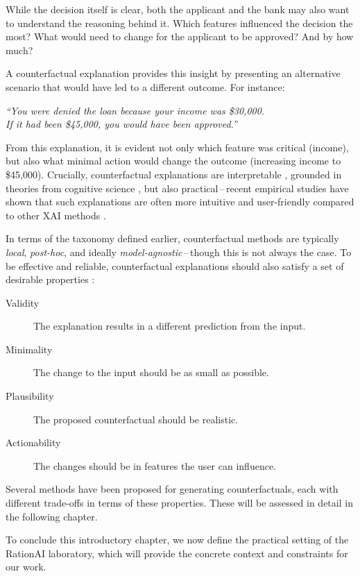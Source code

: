 While the decision itself is clear, both the applicant and the bank may also want to understand the reasoning behind it. Which features influenced the decision the most? What would need to change for the applicant to be approved? And by how much?

A counterfactual explanation provides this insight by presenting an alternative scenario that would have led to a different outcome. For instance:

\begin{center}
    \textit{\enquote{You were denied the loan because your income was \$30,000.\\
        If it had been \$45,000, you would have been approved.}}
\end{center}

From this explanation, it is evident not only which feature was critical (income), but also what minimal action would change the outcome (increasing income to \$45,000).
Crucially, counterfactual explanations are interpretable \cite{pearl2009causal},
grounded in theories from cognitive science \cite{byrne2019counterfactuals},
but also practical\,--\,recent empirical studies have shown that such explanations are often
more intuitive and user-friendly compared to other XAI methods \cite{warren2022features}.

In terms of the taxonomy defined earlier, counterfactual methods are typically \emph{local}, \emph{post-hoc}, and ideally \emph{model-agnostic}\,--\,though this is not always the case.
To be effective and reliable, counterfactual explanations should also satisfy a set of desirable properties \cite{guidotti2018survey}:

\begin{description}
    \item[Validity] The explanation results in a different prediction from the input.
    \item[Minimality] The change to the input should be as small as possible.
    \item[Plausibility] The proposed counterfactual should be realistic.
    \item[Actionability] The changes should be in features the user can influence.
\end{description}

Several methods have been proposed for generating counterfactuals,
each with different trade-offs in terms of these properties.
These will be assessed in detail in the following chapter.

To conclude this introductory chapter,
we now define the practical setting of the RationAI laboratory,
which will provide the concrete context and constraints for our work.

